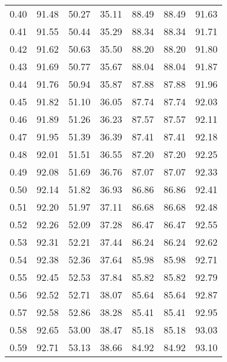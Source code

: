 \begin{tabular}{|c|c|c|c|c|c|c|}
      0.40 &     91.48 &     50.27 &      35.11 &   88.49 &      88.49 &         91.63 \\
      0.41 &     91.55 &     50.44 &      35.29 &   88.34 &      88.34 &         91.71 \\
      0.42 &     91.62 &     50.63 &      35.50 &   88.20 &      88.20 &         91.80 \\
      0.43 &     91.69 &     50.77 &      35.67 &   88.04 &      88.04 &         91.87 \\
      0.44 &     91.76 &     50.94 &      35.87 &   87.88 &      87.88 &         91.96 \\
      0.45 &     91.82 &     51.10 &      36.05 &   87.74 &      87.74 &         92.03 \\
      0.46 &     91.89 &     51.26 &      36.23 &   87.57 &      87.57 &         92.11 \\
      0.47 &     91.95 &     51.39 &      36.39 &   87.41 &      87.41 &         92.18 \\
      0.48 &     92.01 &     51.51 &      36.55 &   87.20 &      87.20 &         92.25 \\
      0.49 &     92.08 &     51.69 &      36.76 &   87.07 &      87.07 &         92.33 \\
      0.50 &     92.14 &     51.82 &      36.93 &   86.86 &      86.86 &         92.41 \\
      0.51 &     92.20 &     51.97 &      37.11 &   86.68 &      86.68 &         92.48 \\
      0.52 &     92.26 &     52.09 &      37.28 &   86.47 &      86.47 &         92.55 \\
      0.53 &     92.31 &     52.21 &      37.44 &   86.24 &      86.24 &         92.62 \\
      0.54 &     92.38 &     52.36 &      37.64 &   85.98 &      85.98 &         92.71 \\
      0.55 &     92.45 &     52.53 &      37.84 &   85.82 &      85.82 &         92.79 \\
      0.56 &     92.52 &     52.71 &      38.07 &   85.64 &      85.64 &         92.87 \\
      0.57 &     92.58 &     52.86 &      38.28 &   85.41 &      85.41 &         92.95 \\
      0.58 &     92.65 &     53.00 &      38.47 &   85.18 &      85.18 &         93.03 \\
      0.59 &     92.71 &     53.13 &      38.66 &   84.92 &      84.92 &         93.10 \\

\end{tabular}
